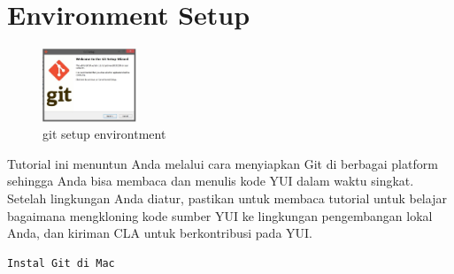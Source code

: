 \sloppy
\section{Environment Setup}
\begin{figure}[ht]
	\centerline{\includegraphics[width=0.25\textwidth]{Figures/gitenvirontment}}
	\caption{git setup environtment}
	\label{gitenvirontment}
\end{figure}
\vspace{12pt}
\noindent 
Tutorial ini menuntun Anda melalui cara menyiapkan Git di berbagai platform sehingga Anda bisa membaca dan menulis kode YUI dalam waktu singkat. $  $Setelah lingkungan Anda diatur, pastikan untuk membaca tutorial $  $untuk belajar bagaimana mengkloning kode sumber YUI ke lingkungan pengembangan lokal Anda, dan kiriman CLA untuk berkontribusi pada YUI. \par
\vspace{12pt}
\noindent
\begin{verbatim}
Instal Git di Mac
\end{verbatim} 
 
